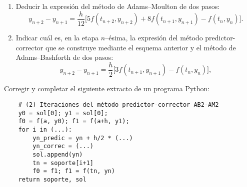 \documentclass[11pt]{article}
\begin{document}
\begin{problemas}
  \begin{problema}
    \begin{enumerate}
    \item Deducir la expresión del método de Adams--Moulton de dos
      pasos:
      \begin{equation*}
        y_{n+2}-y_{n+1} = \frac{h}{12} \big[
        5f(t_{n+2},y_{n+2}) + 8 f(t_{n+1},y_{n+1}) - f(t_{n},y_{n}) \big].
      \end{equation*}

  \item Indicar cuál es, en la etapa $n$--ésima, la expresión del
    método predictor-corrector que se construye mediante el esquema
    anterior y el método de Adams--Bashforth de dos pasos: 
    \begin{equation*}
      y_{n+2}-y_{n+1} = \frac{h}{2} \big[
      3f(t_{n+1},y_{n+1}) - f(t_{n},y_{n}) \big],
    \end{equation*} 
    \end{enumerate}
  \item Corregir y completar el siguiente extracto de un programa Python:
\begin{verbatim}
    # (2) Iteraciones del método predictor-corrector AB2-AM2
    y0 = sol[0]; y1 = sol[0];
    f0 = f(a, y0); f1 = f(a+h, y1);
    for i in (...):
        yn_predic = yn + h/2 * (...)
        yn_correc = (...)
        sol.append(yn)
        tn = soporte[i+1]
        f0 = f1; f1 = f(tn, yn)
    return soporte, sol
\end{verbatim}
  \end{problema}
  \end{problemas}
\end{document}
